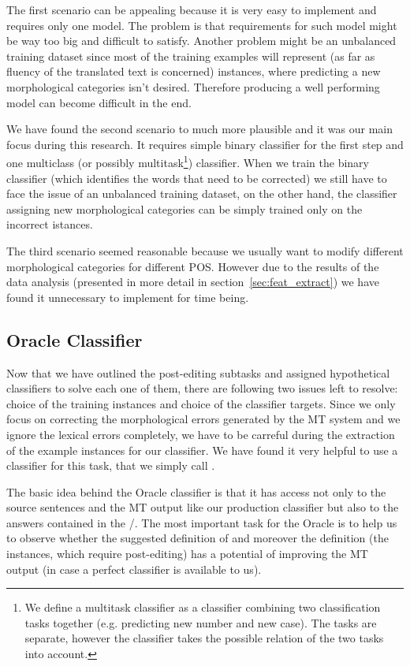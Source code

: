 The first scenario can be appealing because it is very easy to implement and requires only one model.
The problem is that requirements for such model might be way too big and difficult to satisfy. Another
problem might be an unbalanced training dataset since most of the training examples will represent
 (as far as fluency of the translated text is concerned)
instances, where predicting a new morphological categories isn't desired. Therefore
producing a well performing model can become difficult in the end.

We have found the second scenario to much more plausible and it was our main focus during this research.
It requires simple binary classifier for the first step and one multiclass (or possibly multitask\footnote{We
define a multitask classifier as a classifier combining two classification tasks together (e.g. predicting new number and new case).
The tasks are separate, however the classifier takes the possible relation of the two tasks into account.}) classifier.
When we train the binary classifier (which identifies the words that need to be corrected) we still have to face
the issue of an unbalanced training dataset, on the other hand, the classifier assigning new morphological categories
can be simply trained only on the incorrect istances.

The third scenario seemed reasonable because we usually want to modify different morphological categories for different POS.
However due to the results of the data analysis (presented in more detail in section~\ref{sec:feat_extract}) we have found it unnecessary to implement for time being.

\subsection{Oracle Classifier}

Now that we have outlined the post-editing subtasks and assigned hypothetical classifiers 
to solve each one of them, there are following two issues left to resolve: choice of the
training instances and choice of the classifier targets. Since we only focus on correcting the morphological
errors generated by the MT system and we ignore the lexical errors completely, we have to be carreful
during the extraction of the example instances for our classifier. We have found it very helpful to
use a  classifier for this task, that we simply call .

The basic idea behind the Oracle classifier is that it has access not only to the
source sentences and the MT output like our production classifier but also to the  answers
contained in the /. The most important
task for the Oracle is to help us to observe whether the suggested definition of  and
moreover the definition  (the instances, which require post-editing)
has a potential of improving the MT output (in case a perfect classifier is available to us).

